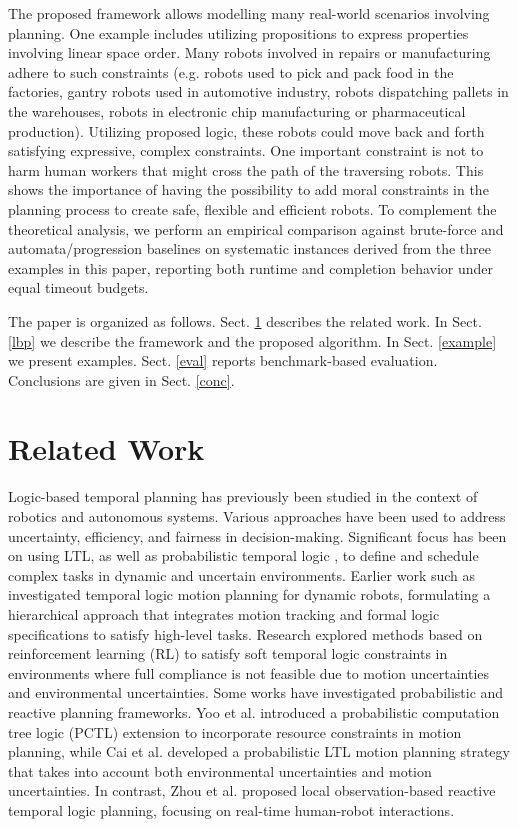 \documentclass[]{jair}
\begin{document}
The proposed framework allows modelling many real-world scenarios involving planning. One example includes utilizing propositions to express properties involving linear space order. Many robots involved in repairs or manufacturing adhere to such constraints (e.g. robots used to pick and pack food in the factories, gantry robots used in automotive industry, robots dispatching pallets in the warehouses, robots in electronic chip manufacturing or pharmaceutical production). Utilizing proposed logic, these robots could move back and forth satisfying expressive, complex constraints. One important constraint is not to harm human workers that might cross the path of the traversing robots. This shows the importance of having the possibility to add moral constraints in the planning process  to create safe, flexible and efficient robots.    
To complement the theoretical analysis, we perform an empirical comparison against brute-force and automata/progression baselines on systematic instances derived from the three examples in this paper, reporting both runtime and completion behavior under equal timeout budgets.

The paper is organized as follows. Sect. \ref{related} describes the related work. In Sect. \ref{lbp} we describe the framework and the proposed algorithm. In Sect. \ref{example} we present examples. Sect. \ref{eval} reports benchmark-based evaluation. Conclusions are given in Sect. \ref{conc}.
\section{Related Work}\label{related}

Logic-based temporal planning has previously been studied in the context of robotics and autonomous systems. Various approaches have been used to address uncertainty, efficiency, and fairness in decision-making. Significant focus has been on using LTL, as well as probabilistic temporal logic \cite{konur2011realtimeprobabilistictemporallogics}, to define and schedule complex tasks in dynamic and uncertain environments. 
Earlier work such as \cite{fainekos2009temporal} investigated temporal logic motion planning for dynamic robots, formulating a hierarchical approach that integrates motion tracking and formal logic specifications to satisfy high-level tasks. Research \cite{cai2024reinforcement} explored methods based on reinforcement learning (RL) to satisfy soft temporal logic constraints in environments where full compliance is not feasible due to motion uncertainties and environmental uncertainties.
Some works have investigated probabilistic and reactive planning frameworks. Yoo et al. \cite{yoo2013probabilistic} introduced a probabilistic computation tree logic (PCTL) extension to incorporate resource constraints in motion planning, while Cai et al. \cite{cai2021probabilistic} developed a probabilistic LTL motion planning strategy that takes into account both environmental uncertainties and motion uncertainties. In contrast, Zhou et al. \cite{kan2024local} proposed local observation-based reactive temporal logic planning, focusing on real-time human-robot interactions.
\end{document}
